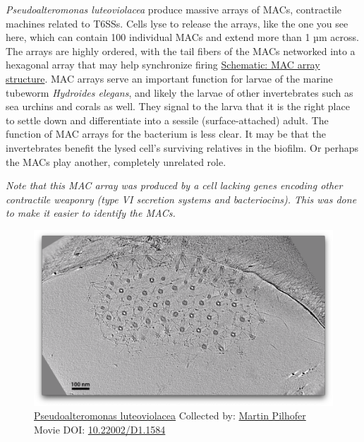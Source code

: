 \documentclass[]{tufte-book}
\begin{document}
\emph{Pseudoalteromonas luteoviolacea} produce massive arrays of MACs,
contractile machines related to T6SSs. Cells lyse to release the arrays,
like the one you see here, which can contain 100 individual MACs and
extend more than 1 µm across. The arrays are highly ordered, with the
tail fibers of the MACs networked into a hexagonal array that may help
synchronize firing \protect\hyperlink{MAC_array_structure}{Schematic:
MAC array structure}. MAC arrays serve an important function for larvae
of the marine tubeworm \emph{Hydroides elegans}, and likely the larvae
of other invertebrates such as sea urchins and corals as well. They
signal to the larva that it is the right place to settle down and
differentiate into a sessile (surface-attached) adult. The function of
MAC arrays for the bacterium is less clear. It may be that the
invertebrates benefit the lysed cell's surviving relatives in the
biofilm. Or perhaps the MACs play another, completely unrelated role.

\emph{Note that this MAC array was produced by a cell lacking genes
encoding other contractile weaponry (type VI secretion systems and
bacteriocins). This was done to make it easier to identify the MACs.}





\begin{figure}
\includegraphics{movie_stills/9_7b} \caption[\protect\hyperlink{tree}{Pseudoalteromonas luteoviolacea}
Collected by: \protect\hyperlink{martin_pilhofer}{Martin Pilhofer} Movie
DOI: \href{https://doi.org/10.22002/D1.1584}{10.22002/D1.1584}]{\protect\hyperlink{tree}{Pseudoalteromonas luteoviolacea}
Collected by: \protect\hyperlink{martin_pilhofer}{Martin Pilhofer} Movie
DOI: \href{https://doi.org/10.22002/D1.1584}{10.22002/D1.1584}}\label{fig:9-7b}
\end{figure}
\end{document}
